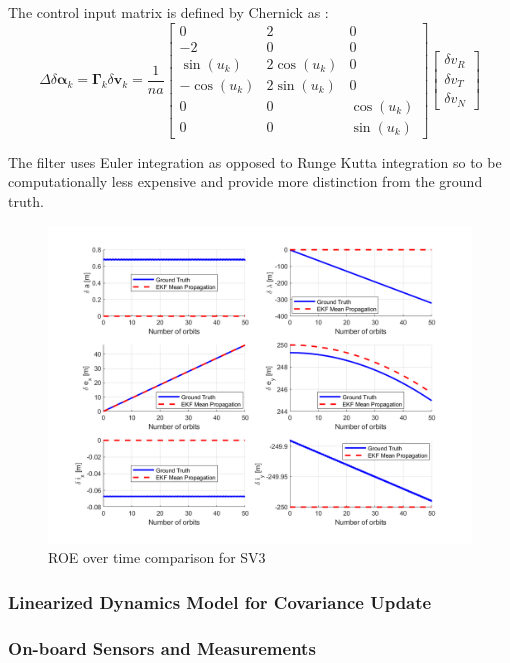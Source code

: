 The control input matrix is defined by Chernick as \cite{chernick2021optimal}:
\begin{equation}
\Delta \delta \boldsymbol{\alpha}_k = \boldsymbol{\Gamma}_k \delta \mathbf{v}_k = 
\frac{1}{n a}
\begin{bmatrix}
0 & 2 & 0 \\
-2 & 0 & 0 \\
\sin(u_k) & 2 \cos(u_k) & 0 \\
-\cos(u_k) & 2 \sin(u_k) & 0 \\
0 & 0 & \cos(u_k) \\
0 & 0 & \sin(u_k)
\end{bmatrix}
\begin{bmatrix}
\delta v_R \\
\delta v_T \\
\delta v_N
\end{bmatrix}
\end{equation}



The filter uses Euler integration as opposed to Runge Kutta integration so to be computationally less expensive and provide more distinction from the ground truth. 

\begin{figure}[H]
    \centering
    \includegraphics[width=0.75\linewidth]{sim/figures/PS7/ROE_over_time_SV3_comparison.png}
    \caption{ROE over time comparison for SV3}
    \label{fig:enter-label}
\end{figure}

\subsubsection{Linearized Dynamics Model for Covariance Update}

\subsubsection{On-board Sensors and Measurements}

